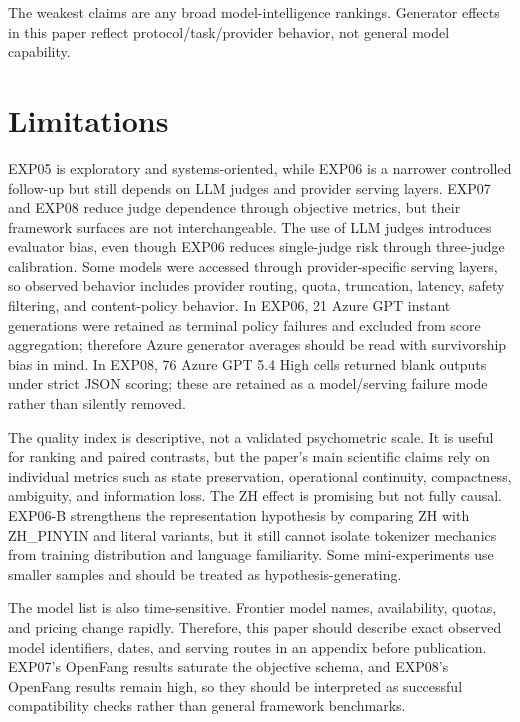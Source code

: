 \documentclass[11pt]{article}
\begin{document}
The weakest claims are any broad model-intelligence rankings. Generator effects in this paper reflect protocol/task/provider behavior, not general model capability.

\section{Limitations}
EXP05 is exploratory and systems-oriented, while EXP06 is a narrower controlled follow-up but still depends on LLM judges and provider serving layers. EXP07 and EXP08 reduce judge dependence through objective metrics, but their framework surfaces are not interchangeable. The use of LLM judges introduces evaluator bias, even though EXP06 reduces single-judge risk through three-judge calibration. Some models were accessed through provider-specific serving layers, so observed behavior includes provider routing, quota, truncation, latency, safety filtering, and content-policy behavior. In EXP06, 21 Azure GPT instant generations were retained as terminal policy failures and excluded from score aggregation; therefore Azure generator averages should be read with survivorship bias in mind. In EXP08, 76 Azure GPT 5.4 High cells returned blank outputs under strict JSON scoring; these are retained as a model/serving failure mode rather than silently removed.

The quality index is descriptive, not a validated psychometric scale. It is useful for ranking and paired contrasts, but the paper's main scientific claims rely on individual metrics such as state preservation, operational continuity, compactness, ambiguity, and information loss. The ZH effect is promising but not fully causal. EXP06-B strengthens the representation hypothesis by comparing ZH with ZH\_PINYIN and literal variants, but it still cannot isolate tokenizer mechanics from training distribution and language familiarity. Some mini-experiments use smaller samples and should be treated as hypothesis-generating.

The model list is also time-sensitive. Frontier model names, availability, quotas, and pricing change rapidly. Therefore, this paper should describe exact observed model identifiers, dates, and serving routes in an appendix before publication. EXP07's OpenFang results saturate the objective schema, and EXP08's OpenFang results remain high, so they should be interpreted as successful compatibility checks rather than general framework benchmarks.
\end{document}
